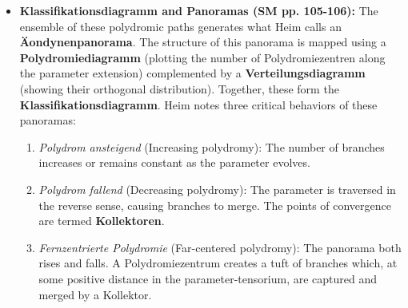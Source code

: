 \documentclass[12pt]{article}
\begin{document}
\begin{itemize}
    \item \textbf{Klassifikationsdiagramm and Panoramas (SM pp. 105-106):} The ensemble of these polydromic paths generates what Heim calls an \textbf{Äondynenpanorama}. The structure of this panorama is mapped using a \textbf{Polydromiediagramm} (plotting the number of Polydromiezentren along the parameter extension) complemented by a \textbf{Verteilungsdiagramm} (showing their orthogonal distribution). Together, these form the \textbf{Klassifikationsdiagramm}. Heim notes three critical behaviors of these panoramas:
    \begin{enumerate}
        \item \textit{Polydrom ansteigend} (Increasing polydromy): The number of branches increases or remains constant as the parameter evolves.
        \item \textit{Polydrom fallend} (Decreasing polydromy): The parameter is traversed in the reverse sense, causing branches to merge. The points of convergence are termed \textbf{Kollektoren}.
        \item \textit{Fernzentrierte Polydromie} (Far-centered polydromy): The panorama both rises and falls. A Polydromiezentrum creates a tuft of branches which, at some positive distance in the parameter-tensorium, are captured and merged by a Kollektor.
    \end{enumerate}


\end{itemize}
\end{document}

